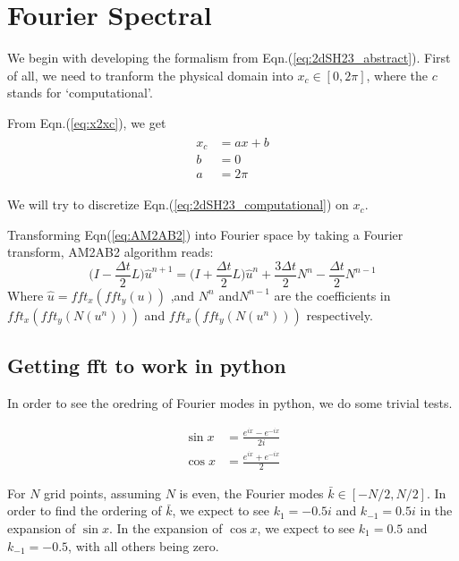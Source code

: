 \documentclass{article}
\begin{document}
\section{Fourier Spectral}
We begin with developing the formalism from Eqn.(\ref{eq:2dSH23_abstract}). First of all, we need to tranform the physical domain into $x_{c} \in [0, 2\pi]$, where the $c$ stands for `computational'.

From Eqn.(\ref{eq:x2xc}), we get
\begin{align}\label{eq:x2xc_Fourier}
 \begin{split}
  x_{c} &= ax + b\\
  b     &= 0\\
  a     &= 2\pi
 \end{split}
\end{align}

We will try to discretize Eqn.(\ref{eq:2dSH23_computational}) on $x_{c}$. 

Transforming Eqn(\ref{eq:AM2AB2}) into Fourier space by taking a Fourier transform,  AM2AB2 algorithm reads:
\begin{equation}\label{eq:AM2AB2_Fourier}
 \bigg( I - \frac{\Delta t}{2} L \bigg) \hat{u}^{n+1} = \bigg( I + \frac{\Delta t}{2} L \bigg)\hat{u}^{n} + \frac{3 \Delta t}{2} N^{n} - \frac{\Delta t}{2} N^{n-1}
\end{equation}
Where $\hat{u} = fft_{x}(fft_{y}(u))$ ,and $N^{n}$ and$N^{n-1}$ are the coefficients in $fft_{x}(fft_{y}(N(u^{n})))$ and $fft_{x}(fft_{y}(N(u^{n})))$ respectively.
\subsection{Getting fft to work in python}
In order to see the oredring of Fourier modes in python, we do some trivial tests.

\begin{align*}
 \sin{x} &= \frac{e^{ix} - e^{-ix}}{2i}\\
 \cos{x} &= \frac{e^{ix} + e^{-ix}}{2}
\end{align*}

For $N$ grid points, assuming $N$ is even, the Fourier modes $\bar{k} \in [-N/2, N/2]$. In order to find the ordering of $\bar{k}$, we expect to see $ k_{1} = -0.5i$ and $k_{-1} = 0.5 i$ in the expansion of $\sin{x}$. In the expansion of $\cos{x}$, we expect to see $ k_{1} = 0.5$ and $k_{-1} = -0.5$, with all others being zero. 
\end{document}
